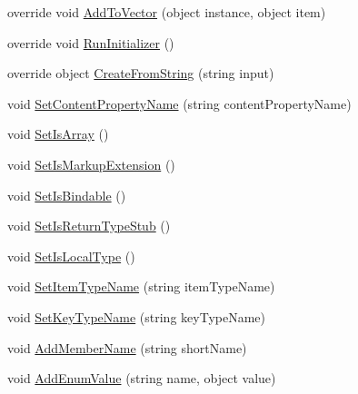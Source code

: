 \begin{DoxyCompactItemize}
override void \hyperlink{class_e_l_i_client_1_1_e_l_i_client___xaml_type_info_1_1_xaml_user_type_a212eb4d186b8a5798d6666f8fbd21921}{Add\+To\+Vector} (object instance, object item)
\item 
override void \hyperlink{class_e_l_i_client_1_1_e_l_i_client___xaml_type_info_1_1_xaml_user_type_a78347a092b725bf90a0ad3a23fc09304}{Run\+Initializer} ()
\item 
override object \hyperlink{class_e_l_i_client_1_1_e_l_i_client___xaml_type_info_1_1_xaml_user_type_a848d739150fec23c2400d5718049ea30}{Create\+From\+String} (string input)
\item 
void \hyperlink{class_e_l_i_client_1_1_e_l_i_client___xaml_type_info_1_1_xaml_user_type_a50b781dfa7e66028905f1c87d6225aa0}{Set\+Content\+Property\+Name} (string content\+Property\+Name)
\item 
void \hyperlink{class_e_l_i_client_1_1_e_l_i_client___xaml_type_info_1_1_xaml_user_type_a0080f0e1e012ffece2004457228b709e}{Set\+Is\+Array} ()
\item 
void \hyperlink{class_e_l_i_client_1_1_e_l_i_client___xaml_type_info_1_1_xaml_user_type_a2c6f690fd071acce19668edc1dfd1f93}{Set\+Is\+Markup\+Extension} ()
\item 
void \hyperlink{class_e_l_i_client_1_1_e_l_i_client___xaml_type_info_1_1_xaml_user_type_a78e1655dc00ebc2b19fc635a881e4b38}{Set\+Is\+Bindable} ()
\item 
void \hyperlink{class_e_l_i_client_1_1_e_l_i_client___xaml_type_info_1_1_xaml_user_type_a20f13f430b27304972385249b0ae8613}{Set\+Is\+Return\+Type\+Stub} ()
\item 
void \hyperlink{class_e_l_i_client_1_1_e_l_i_client___xaml_type_info_1_1_xaml_user_type_af6a3dfcb7a63cac842cc635578a7722b}{Set\+Is\+Local\+Type} ()
\item 
void \hyperlink{class_e_l_i_client_1_1_e_l_i_client___xaml_type_info_1_1_xaml_user_type_a85efcc8b7d9e26f390e400af5767d25d}{Set\+Item\+Type\+Name} (string item\+Type\+Name)
\item 
void \hyperlink{class_e_l_i_client_1_1_e_l_i_client___xaml_type_info_1_1_xaml_user_type_a8a9dec2e38ff7e47ce65fab2dbf9346f}{Set\+Key\+Type\+Name} (string key\+Type\+Name)
\item 
void \hyperlink{class_e_l_i_client_1_1_e_l_i_client___xaml_type_info_1_1_xaml_user_type_a7cc17534014002de27e44ac41b40b4c0}{Add\+Member\+Name} (string short\+Name)
\item 
void \hyperlink{class_e_l_i_client_1_1_e_l_i_client___xaml_type_info_1_1_xaml_user_type_afd9db55de0391c8a7216e6bce2f3d675}{Add\+Enum\+Value} (string name, object value)

\end{DoxyCompactItemize}
